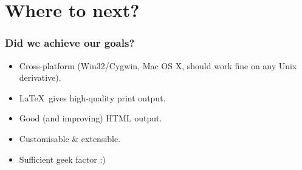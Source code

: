 \documentclass[pdftex,notes=onlyslideswithnotes]{beamer}
\begin{document}
\section[Future]{Where to next?}


\frame
{
	\frametitle{Did we achieve our goals?}
	
	\begin{itemize}
	
		\item Cross-platform (Win32/Cygwin, Mac OS X, should work fine
		on any Unix derivative).
		
		\item \LaTeX\ gives high-quality print output.
		
		\item Good (and improving) HTML output.
		
		\item Customisable \& extensible.
		
		\item Sufficient geek factor :)
		
	\end{itemize}
	
	\begin{center}
	
	
	\end{center}
}
\end{document}
